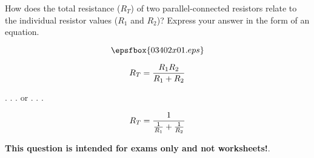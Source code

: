 

How does the total resistance ($R_T$) of two parallel-connected resistors relate to the individual resistor values ($R_1$ and $R_2$)?  Express your answer in the form of an equation.

$$\epsfbox{03402x01.eps}$$







$$R_T = {{R_1 R_2} \over {R_1 + R_2}}$$

\vskip 10pt

\centerline{ . . . or . . .}

$$R_T = {1 \over {{1 \over R_1} + {1 \over R_2}}}$$







{\bf This question is intended for exams only and not worksheets!}.



